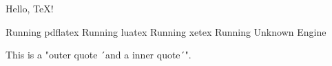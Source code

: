 \documentclass[english,parskip=half,12pt,a4paper]{scrartcl}
\begin{document}
Hello, \TeX!

\ifPDFTeX
  Running pdflatex
\else\ifLuaTeX
  Running luatex
\else\ifXeTeX
  Running xetex
\else
  Running Unknown Engine
\fi\fi\fi

This is a "outer quote ´and a inner quote´".

\lipsum[2-4]

\lipsum[6-8]
\end{document}
